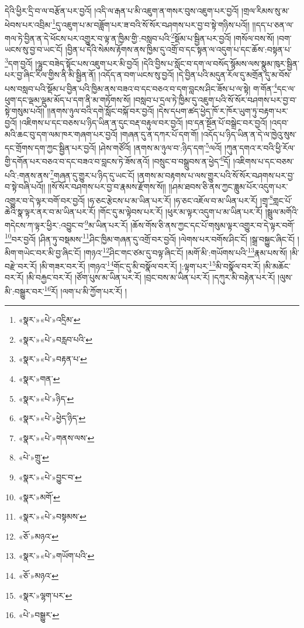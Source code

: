 དེའི་ཕྱིར་དྲི་བ་ལ་བརྩོན་པར་བྱའོ། །འདི་ལ་རྒན་པ་མི་འཇུག་ན་གསར་བུས་འཇུག་པར་བྱའོ། །གྲལ་རིམས་སུ་མ་ཕེབས་པར་འབྲིམ་\footnote{«སྣར་»«པེ་»འདྲིམ་}དུ་འཇུག་པ་མ་བཟློག་པར་ཟ་བའི་སོ་སོར་བཤགས་པར་བྱ་བ་སྟེ་གཉིས་པའོ།། །།དད་པ་ཅན་ལ་གལ་ཏེ་བྱིན་ན་དེ་ཕོངས་པར་འགྱུར་བ་ལྟ་ན་ཁྱིམ་གྱི་:བསླབ་པའི་\footnote{«སྣར་»«པེ་»བརླབ་པའི་}སྡོམ་པ་སྦྱིན་པར་བྱའོ། །གསོལ་བས་སོ། །བག་ཡངས་སུ་བྱ་བ་ཡང་ངོ། །བྱིན་པ་དེའི་སེམས་རྟོགས་ནས་ཁྱིམ་དུ་འགྲོ་བ་དང་སྟན་ལ་འདུག་པ་དང་ཆོས་:བསྟན་པ་\footnote{«སྣར་»«པེ་»བརྟན་པ་}དག་བྱའོ། །ལྷུང་བཟེད་སྟོང་པས་འཇུག་པར་མི་བྱའོ། །དེའི་བྱིས་པ་སློང་བ་དག་ལ་བསོད་སྙོམས་ལས་སྣུམ་ཁུར་སྦྱིན་པར་བྱ་ཞིང་རིལ་གྱིས་ནི་མི་སྦྱིན་ནོ། །འདོད་ན་བག་ཡངས་སུ་བྱའོ། །དེ་བྱིན་པའི་མདུན་རོལ་དུ་མགྲོན་དུ་མ་བོས་པས་བསླབ་པའི་སྡོམ་པ་བྱིན་པའི་ཁྱིམ་ནས་བཟའ་བ་དང་བཅའ་བ་དག་བླངས་ཤིང་ཟོས་པ་ལ་སྟེ། ག་གོན་\footnote{«སྣར་»གན་}དང་ལ་ཕུག་དང་ལྡམ་ལྡུམ་མོད་པ་དག་ནི་མ་གཏོགས་སོ། །བསླབ་པ་དྲལ་ཏེ་ཁྱིམ་དུ་འཇུག་པའི་སོ་སོར་བཤགས་པར་བྱ་བ་སྟེ་གསུམ་པའོ།། །།ནགས་ཉུལ་བའི་དགེ་སློང་བསྐོ་བར་བྱའོ། །དེས་དཔག་ཚད་ཕྱེད་ཁོ་ར་ཁོར་ཡུག་ཏུ་བརྟག་པར་བྱའོ། །འཇིགས་པ་དང་བཅས་པ་ཉིད་ཡིན་ན་དུང་བརྡ་བརྟུལ་བར་བྱའོ། །བ་དན་སྔོན་པོ་བསྒྲེང་བར་བྱའོ། །འདབ་མའི་ཆང་བུ་དག་ལམ་ཁར་གཞག་པར་བྱའོ། །གཞན་དུ་ན་དཀར་པོ་དག་གོ། །འདོད་པ་ཉིད་ཡིན་ན་དེ་ལ་ཁྱེའུ་སུས་དང་གྲོགས་དག་ཀྱང་སྦྱིན་པར་བྱའོ། །ཤེས་གཙོའོ། །ནགས་མ་ཉུལ་བ་:ཉིད་དག་\footnote{«སྣར་»«པེ་»ཉིད་}ལའོ། །ཀུན་དགའ་ར་བའི་ཕྱི་རོལ་གྱི་དགོན་པར་བཅའ་བ་དང་བཟའ་བ་བླངས་ཏེ་ཟོས་ནའོ། །བསྲུང་བ་བསྒྲུབས་ན་ཕྱེད་\footnote{«སྣར་»«པེ་»ཕྱེད་ཉིད་}དོ། །འཇིགས་པ་དང་བཅས་པའི་:གནས་ནས་\footnote{«སྣར་»«པེ་»གནས་ལས་}གཞན་དུ་གྱུར་པ་ཉིད་དུ་ཡང་ངོ། །ནགས་མ་བརྟགས་པ་ལས་གྱུར་པའི་སོ་སོར་བཤགས་པར་བྱ་བ་སྟེ་བཞི་པའོ།། །།སོ་སོར་བཤགས་པར་བྱ་བ་རྣམས་རྫོགས་སོ།། །།ཤམ་ཐབས་ཅི་ནས་ཀྱང་ཟླུམ་པོར་འདུག་པར་འགྱུར་བ་དེ་ལྟར་བགོ་བར་བྱའོ། །ཧ་ཅང་རྩེངས་པ་མ་ཡིན་པར་རོ། །ཧ་ཅང་འཇོལ་བ་མ་ཡིན་པར་རོ། །གྲྭ་\footnote{«པེ་»གྲུ་}གླང་པོ་ཆེའི་སྣ་ལྟར་ནར་བ་མ་ཡིན་པར་རོ། །གོང་དུ་མ་ལྟེབས་པར་རོ། །ཕུར་མ་ལྟར་འདུག་པ་མ་ཡིན་པར་རོ། །སྦྲུལ་མགོའི་གདེངས་ཀ་ལྟར་ཕྱིར་:འབྱུང་བ་\footnote{«སྣར་»«པེ་»བྱུང་བ་}མ་ཡིན་པར་རོ། །ཆོས་གོས་ཅི་ནས་ཀྱང་དང་པོ་གསུམ་ལྟར་འགྱུར་བ་དེ་ལྟར་བགོ་\footnote{«སྣར་»མགོ་}བར་བྱའོ། །ཤིན་ཏུ་བསྡམས་\footnote{«སྣར་»«པེ་»བསྟམས་}ཤིང་ཁྱིམ་གཞན་དུ་འགྲོ་བར་བྱའོ། །ལེགས་པར་བགོས་ཤིང་ངོ། །སྒྲ་བསྐྱུང་ཞིང་ངོ། །མིག་གཡེང་བར་མི་བྱ་ཞིང་ངོ། །གཉའ་\footnote{«ཅོ་»མཉའ་}ཤིང་གང་ཙམ་དུ་བལྟ་ཞིང་ངོ། །མགོ་མི་:གཡོགས་པའི་\footnote{«སྣར་»«པེ་»གཡོག་པའི་}རྣམ་པས་སོ། །མི་བརྫེ་བར་རོ། །མི་གཟར་བར་རོ། །གཉའ་\footnote{«ཅོ་»མཉའ་}གོང་དུ་མི་བསྣོལ་བར་རོ། །:ལྟག་པར་\footnote{«སྣར་»ལྷག་པར་}མི་བསྣོལ་བར་རོ། །མི་མཆོང་བར་རོ། །མི་བརྐྱང་བར་རོ། །ཙོག་པུས་མ་ཡིན་པར་རོ། །བྲང་བས་མ་ཡིན་པར་རོ། །དཀུར་མི་བརྟེན་པར་རོ། །ལུས་མི་:བསྒྱུར་བར་\footnote{«པེ་»བསྒྱུར་}རོ། །ལག་པ་མི་ཀྱོག་པར་རོ། །
